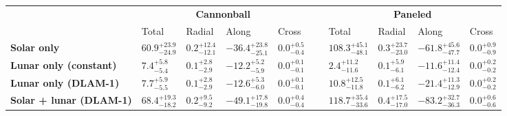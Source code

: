 \begin{tabular}{llllllllll}
\toprule
 & \multicolumn{4}{c}{\bfseries Cannonball} & \bfseries  & \multicolumn{4}{c}{\bfseries Paneled} \\
 & Total & Radial & Along & Cross &  & Total & Radial & Along & Cross \\
\cmidrule{2-5}\cmidrule{7-10}
\bfseries Solar only & $60.9_{-24.9}^{+23.9}$ & $0.2_{-12.1}^{+12.4}$ & $-36.4_{-25.1}^{+23.8}$ & $0.0_{-0.4}^{+0.5}$ & ~ & $108.3_{-48.1}^{+45.1}$ & $0.3_{-23.0}^{+23.7}$ & $-61.8_{-47.7}^{+45.6}$ & $0.0_{-0.9}^{+0.9}$ \\
\bfseries Lunar only (constant) & $7.4_{-5.4}^{+5.8}$ & $0.1_{-2.9}^{+2.8}$ & $-12.2_{-5.9}^{+5.2}$ & $0.0_{-0.1}^{+0.1}$ & ~ & $2.4_{-11.6}^{+11.2}$ & $0.1_{-6.1}^{+5.9}$ & $-11.6_{-12.4}^{+11.4}$ & $0.0_{-0.2}^{+0.2}$ \\
\bfseries Lunar only (DLAM-1) & $7.7_{-5.5}^{+5.9}$ & $0.1_{-2.9}^{+2.8}$ & $-12.6_{-6.0}^{+5.3}$ & $0.0_{-0.1}^{+0.1}$ & ~ & $10.8_{-11.8}^{+12.5}$ & $0.1_{-6.2}^{+6.1}$ & $-21.4_{-12.9}^{+11.3}$ & $0.0_{-0.2}^{+0.2}$ \\
\bfseries Solar + lunar (DLAM-1) & $68.4_{-18.2}^{+19.3}$ & $0.2_{-9.2}^{+9.5}$ & $-49.1_{-19.8}^{+17.8}$ & $0.0_{-0.4}^{+0.4}$ & ~ & $118.7_{-33.6}^{+35.4}$ & $0.4_{-17.0}^{+17.5}$ & $-83.2_{-36.3}^{+32.7}$ & $0.0_{-0.6}^{+0.6}$ \\
\bottomrule
\end{tabular}

